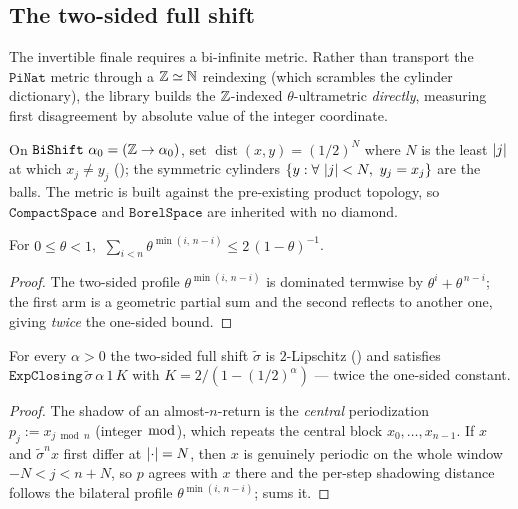 \subsection{The two-sided full shift}

The invertible finale requires a bi-infinite metric. Rather than transport the \(\texttt{PiNat}\)
metric through a \(\mathbb{Z}\simeq\mathbb{N}\) reindexing (which scrambles the cylinder dictionary), the library
builds the \(\mathbb{Z}\)-indexed \(\theta\)-ultrametric \emph{directly}, measuring first disagreement by
absolute value of the integer coordinate.

\begin{definition}\label{def:livsic-bishift-metric}
  \leanok
  On \(\texttt{BiShift}\ \alpha_0 = (\mathbb{Z}\to\alpha_0)\), set \(\operatorname{dist}(x,y) = (1/2)^{N}\) where
  \(N\) is the least \(\left\lvert j \right\rvert\) at which \(x_j\ne y_j\) (); the symmetric
  cylinders \(\{y : \forall\,\left\lvert j \right\rvert<N,\ y_j = x_j\}\) are the balls. The metric is built against
  the pre-existing product topology, so \(\texttt{CompactSpace}\) and \(\texttt{BorelSpace}\) are
  inherited with no diamond.
\end{definition}

\begin{lemma}\label{lem:livsic-minregime}
  \leanok
  For \(0\le\theta<1\), \(\ \sum_{i<n}\theta^{\min(i,\,n-i)} \le 2\,(1-\theta)^{-1}\).
\end{lemma}
\begin{proof}\leanok
  The two-sided profile \(\theta^{\min(i,\,n-i)}\) is dominated termwise by \(\theta^{i} +
  \theta^{\,n-i}\); the first arm is a geometric partial sum and the second reflects to another one,
  giving \emph{twice} the one-sided bound.
\end{proof}

\begin{theorem}\label{thm:livsic-bishift-closing}
  \leanok
  For every \(\alpha>0\) the two-sided full shift \(\tilde\sigma\) is \(2\)-Lipschitz
  () and satisfies
  \(\texttt{ExpClosing}\,\tilde\sigma\,\alpha\,1\,K\) with \(K = 2/(1 - (1/2)^{\alpha})\) --- twice
  the one-sided constant.
\end{theorem}
\begin{proof}\leanok
  The shadow of an almost-\(n\)-return is the \emph{central} periodization \(p_j := x_{j\bmod n}\)
  (integer \(\bmod\)), which repeats the central block \(x_0,\dots,x_{n-1}\). If \(x\) and
  \(\tilde\sigma^n x\) first differ at \(\left\lvert \cdot \right\rvert=N\), then \(x\) is genuinely periodic on the
  whole window \(-N < j < n+N\), so \(p\) agrees with \(x\) there and the per-step shadowing distance
  follows the bilateral profile \(\theta^{\min(i,\,n-i)}\);  sums it.
\end{proof}


